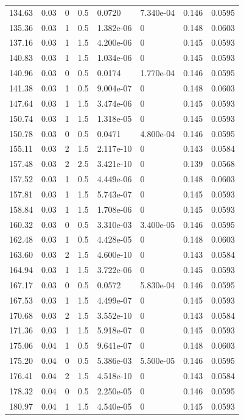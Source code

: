 \documentclass[preview]{standalone}
\begin{document}
{{{\begin{tabular}{L{1.2cm}C{1.2cm} C{0.3cm}C{0.5cm} C{1.4cm}C{1.4cm} C{1.4cm}C{1.4cm}}
  134.63  &  0.03  & 0     & 0.5 &  0.0720  & 7.340e-04  & 0.146 &  0.0595   \\ 
  135.36  &  0.03  & 1     & 0.5 &  1.382e-06  & 0  & 0.148 &  0.0603   \\ 
  137.16  &  0.03  & 1     & 1.5 &  4.200e-06  & 0  & 0.145 &  0.0593   \\ 
  140.83  &  0.03  & 1     & 1.5 &  1.034e-06  & 0  & 0.145 &  0.0593   \\ 
  140.96  &  0.03  & 0     & 0.5 &  0.0174  & 1.770e-04  & 0.146 &  0.0595   \\ 
  141.38  &  0.03  & 1     & 0.5 &  9.004e-07  & 0  & 0.148 &  0.0603   \\ 
  147.64  &  0.03  & 1     & 1.5 &  3.474e-06  & 0  & 0.145 &  0.0593   \\ 
  150.74  &  0.03  & 1     & 1.5 &  1.318e-05  & 0  & 0.145 &  0.0593   \\ 
  150.78  &  0.03  & 0     & 0.5 &  0.0471  & 4.800e-04  & 0.146 &  0.0595   \\ 
  155.11  &  0.03  & 2     & 1.5 &  2.117e-10  & 0  & 0.143 &  0.0584   \\ 
  157.48  &  0.03  & 2     & 2.5 &  3.421e-10  & 0  & 0.139 &  0.0568   \\ 
  157.52  &  0.03  & 1     & 0.5 &  4.449e-06  & 0  & 0.148 &  0.0603   \\ 
  157.81  &  0.03  & 1     & 1.5 &  5.743e-07  & 0  & 0.145 &  0.0593   \\ 
  158.84  &  0.03  & 1     & 1.5 &  1.708e-06  & 0  & 0.145 &  0.0593   \\ 
  160.32  &  0.03  & 0     & 0.5 &  3.310e-03  & 3.400e-05  & 0.146 &  0.0595   \\ 
  162.48  &  0.03  & 1     & 0.5 &  4.428e-05  & 0  & 0.148 &  0.0603   \\ 
  163.60  &  0.03  & 2     & 1.5 &  4.600e-10  & 0  & 0.143 &  0.0584   \\ 
  164.94  &  0.03  & 1     & 1.5 &  3.722e-06  & 0  & 0.145 &  0.0593   \\ 
  167.17  &  0.03  & 0     & 0.5 &  0.0572  & 5.830e-04  & 0.146 &  0.0595   \\ 
  167.53  &  0.03  & 1     & 1.5 &  4.499e-07  & 0  & 0.145 &  0.0593   \\ 
  170.68  &  0.03  & 2     & 1.5 &  3.552e-10  & 0  & 0.143 &  0.0584   \\ 
  171.36  &  0.03  & 1     & 1.5 &  5.918e-07  & 0  & 0.145 &  0.0593   \\ 
  175.06  &  0.04  & 1     & 0.5 &  9.641e-07  & 0  & 0.148 &  0.0603   \\ 
  175.20  &  0.04  & 0     & 0.5 &  5.386e-03  & 5.500e-05  & 0.146 &  0.0595   \\ 
  176.41  &  0.04  & 2     & 1.5 &  4.518e-10  & 0  & 0.143 &  0.0584   \\ 
  178.32  &  0.04  & 0     & 0.5 &  2.250e-05  & 0  & 0.146 &  0.0595   \\ 
  180.97  &  0.04  & 1     & 1.5 &  4.540e-05  & 0  & 0.145 &  0.0593   \\ 
\hline 
\end{tabular} 

}}}
\end{document}
